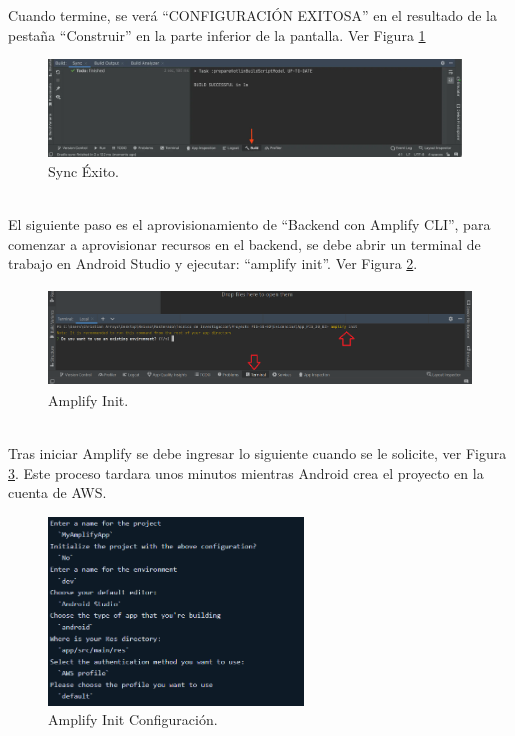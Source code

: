 \documentclass[a4paper,10pt, oneside, titlepage]{article}
\begin{document}
	\indent Cuando termine, se verá ``CONFIGURACIÓN EXITOSA'' en el resultado de la pestaña ``Construir'' en la parte inferior de la pantalla. Ver Figura \ref{Sync_Exito}
	\begin{figure}[!h]
		\centering
		\includegraphics[width = 1\linewidth, height = 2.6cm]{Sync_Exito.png}
		\caption{Sync Éxito.}
		\label{Sync_Exito}
	\end{figure} \\
	\indent El siguiente paso es el aprovisionamiento de ``Backend con Amplify CLI'', para comenzar a aprovisionar recursos en el backend, se debe abrir un terminal de trabajo en Android Studio y ejecutar: ``amplify init''. Ver Figura \ref{Amplify_Init}.
	\begin{figure}[!h]
		\centering
		\includegraphics[width = 1\linewidth, height = 2.6cm]{Amplify_Init.png}
		\caption{Amplify Init.}
		\label{Amplify_Init}
	\end{figure} \\
	\indent Tras iniciar Amplify se debe ingresar lo siguiente cuando se le solicite, ver Figura \ref{Amplify_Init_Configuracion}. Este proceso tardara unos minutos mientras Android crea el proyecto en la cuenta de AWS.
	\begin{figure}[!h]
		\centering
		\includegraphics[width = 1\linewidth, height = 5cm]{Amplify_Init_Configuracion.png}
		\caption{Amplify Init Configuración.}
		\label{Amplify_Init_Configuracion}
	\end{figure} \\
\end{document}
